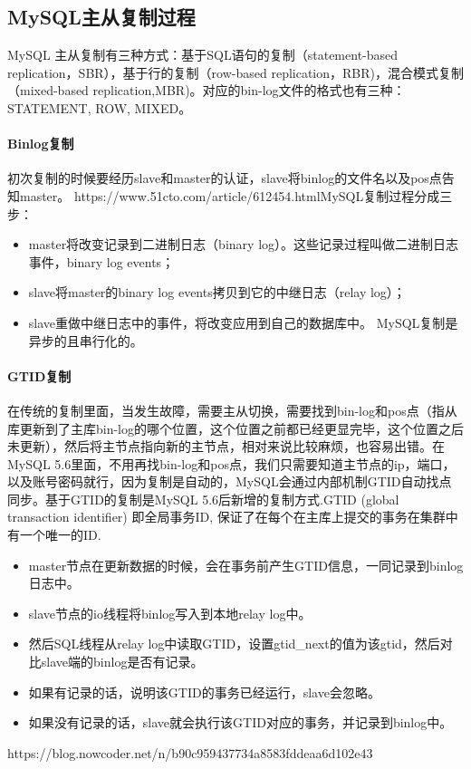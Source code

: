 \documentclass[../../../interview-questions.tex]{subfiles}
\begin{document}
\subsection{MySQL主从复制过程}

MySQL 主从复制有三种方式：基于SQL语句的复制（statement-based replication，SBR），基于行的复制（row-based replication，RBR)，混合模式复制（mixed-based replication,MBR)。对应的bin-log文件的格式也有三种：STATEMENT,  ROW,  MIXED。

\paragraph{Binlog复制}

初次复制的时候要经历slave和master的认证，slave将binlog的文件名以及pos点告知master。
https://www.51cto.com/article/612454.htmlMySQL复制过程分成三步：

\begin{itemize}
    \item {master将改变记录到二进制日志（binary log）。这些记录过程叫做二进制日志事件，binary log events；}
    \item {slave将master的binary log events拷贝到它的中继日志（relay log）；}
    \item {slave重做中继日志中的事件，将改变应用到自己的数据库中。 MySQL复制是异步的且串行化的。}
\end{itemize}

\paragraph{GTID复制}

在传统的复制里面，当发生故障，需要主从切换，需要找到bin-log和pos点（指从库更新到了主库bin-log的哪个位置，这个位置之前都已经更显完毕，这个位置之后未更新），然后将主节点指向新的主节点，相对来说比较麻烦，也容易出错。在MySQL 5.6里面，不用再找bin-log和pos点，我们只需要知道主节点的ip，端口，以及账号密码就行，因为复制是自动的，MySQL会通过内部机制GTID自动找点同步。基于GTID的复制是MySQL 5.6后新增的复制方式.GTID (global transaction identifier) 即全局事务ID, 保证了在每个在主库上提交的事务在集群中有一个唯一的ID.

\begin{itemize}
    \item {master节点在更新数据的时候，会在事务前产生GTID信息，一同记录到binlog日志中。}
    \item {slave节点的io线程将binlog写入到本地relay log中。}
    \item {然后SQL线程从relay log中读取GTID，设置gtid\_next的值为该gtid，然后对比slave端的binlog是否有记录。}
    \item {如果有记录的话，说明该GTID的事务已经运行，slave会忽略。}
    \item {如果没有记录的话，slave就会执行该GTID对应的事务，并记录到binlog中。}
\end{itemize}

https://blog.nowcoder.net/n/b90c959437734a8583fddeaa6d102e43
\end{document}
